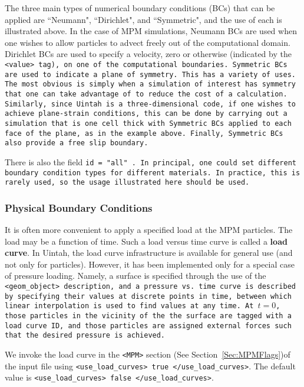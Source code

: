The three main types of numerical boundary conditions (BCs) that can
be applied are ``Neumann", ``Dirichlet", and ``Symmetric", and the use of
each is illustrated above.  In the case of
MPM simulations, Neumann BCs are used when one wishes to allow particles to
advect freely out of the computational domain.  Dirichlet BCs are used to
specify a velocity, zero or otherwise (indicated by the \tt <value> \normalfont
tag), on one of the computational boundaries.
Symmetric BCs are used to indicate a plane of symmetry.  This has a variety
of uses.  The most obvious is simply when a simulation of interest has symmetry
that one can take advantage of to reduce the cost of a calculation.  Similarly,
since Uintah is a three-dimensional code, if one wishes to achieve plane-strain
conditions, this can be done by carrying out a simulation that is one cell thick
with Symmetric BCs applied to each face of the plane, as in the example above.
Finally, Symmetric BCs also provide a free slip boundary.

There is also the field \tt id = "all" \normalfont.  In principal, one could
set different boundary condition types for different materials.  In practice,
this is rarely used, so the usage illustrated here should be used.

\subsubsection{Physical Boundary Conditions} \label{sec:PhysicalBCs}

It is often more convenient to apply a specified load at the MPM particles.
The load may be a function of time.  Such a load versus time curve is called
a {\bf load curve}.
In Uintah, the load curve infrastructure is available for general use
(and not only for particles).  However, it has been implemented only for
a special case of pressure loading.  Namely, a surface is
specified through the use of the \tt <geom\_object> \normalfont description,
and a pressure vs. time curve is described by specifying their values
at discrete points in time, between which linear interpolation is used
to find values at any time.  At $t=0$, those particles in the vicinity
of the the surface are tagged with a load curve ID, and those particles
are assigned external forces such that the desired pressure is achieved.

We invoke the load curve in the \verb|<MPM>| section
(See Section~\ref{Sec:MPMFlags})of the input file
using  \verb|<use_load_curves> true </use_load_curves>|.  The default value
is \verb|<use_load_curves> false </use_load_curves>|.

